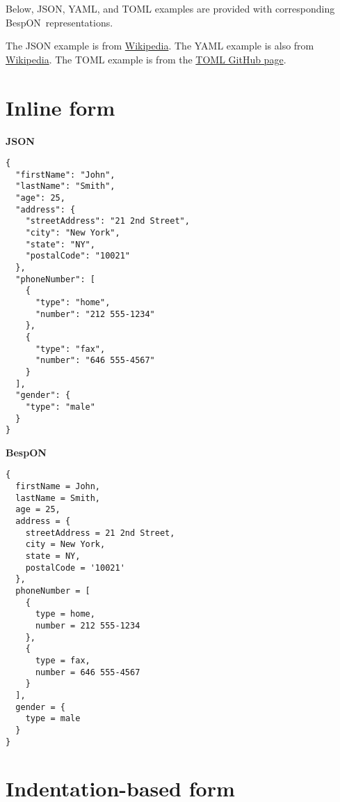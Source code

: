 \documentclass[11pt]{article}
\newcommand{\bespon}{BespON}
\begin{document}
{{\pagebreak
\begin{appendices}

Below, JSON, YAML, and TOML examples are provided with corresponding \bespon\ representations.

The JSON example is from \href{https://en.wikipedia.org/wiki/JSON}{Wikipedia}.  The YAML example is also from \href{https://en.wikipedia.org/wiki/YAML}{Wikipedia}.  The TOML example is from the \href{https://github.com/toml-lang/toml}{TOML GitHub page}.


\section{Inline form}


\begin{tcolorbox}{}
\begin{multicols}{2}

\centering \textbf{JSON}
\begin{Verbatim}[formatcom=\color{DarkGreen}]
{
  "firstName": "John",
  "lastName": "Smith",
  "age": 25,
  "address": {
    "streetAddress": "21 2nd Street",
    "city": "New York",
    "state": "NY",
    "postalCode": "10021"
  },
  "phoneNumber": [
    {
      "type": "home",
      "number": "212 555-1234"
    },
    {
      "type": "fax",
      "number": "646 555-4567"
    }
  ],
  "gender": {
    "type": "male"
  }
}
\end{Verbatim}
\columnbreak
\centering \textbf{BespON}

\begin{Verbatim}
{
  firstName = John,
  lastName = Smith,
  age = 25,
  address = {
    streetAddress = 21 2nd Street,
    city = New York,
    state = NY,
    postalCode = '10021'
  },
  phoneNumber = [
    {
      type = home,
      number = 212 555-1234
    },
    {
      type = fax,
      number = 646 555-4567
    }
  ],
  gender = {
    type = male
  }
}
\end{Verbatim}
\end{multicols}
\end{tcolorbox}



\section{Indentation-based form}


\begin{tcolorbox}{}
\begin{multicols}{2}


\end{multicols}
\end{tcolorbox}
\end{appendices}}}
\end{document}
